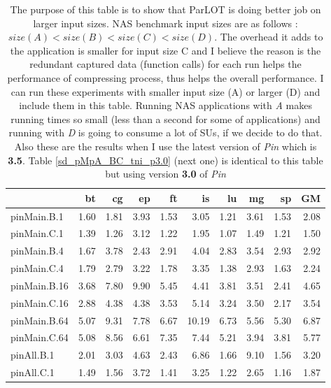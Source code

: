 \begin{table*}[]
 
 \caption{The purpose of this table is to show that ParLOT is doing better job on larger input sizes. NAS benchmark input sizes are as follows : $size(A) < size(B) < size (C) < size(D) $. The overhead it adds to the application is smaller for input size C and I believe the reason is the redundant captured data (function calls) for each run helps the performance of compressing process, thus helps the overall performance. I can run these experiments with smaller input size (A) or larger (D) and include them in this table. Running NAS applications with \textit{A} makes running times so small (less than a second for some of applications) and running with \textit{D} is going to consume a lot of SUs, if we decide to do that. Also these are the results when I use the latest version of \textit{Pin} which is \textbf{3.5}. Table \ref{sd_pMpA_BC_tni_p3.0} (next one) is identical to this table but using version \textbf{3.0} of \textit{Pin}}
 \label{sd_pMpA_BC_tni_p3.5}
\begin{center}
\begin{tabular}{|l|rrrrrrrr|r|}
\hline
              &   bt &    cg &   ep &    ft &    is &   lu &   mg &   sp &   GM \\
\hline
 pinMain.B.1  & 1.60 &  1.81 & 3.93 &  1.53 &  3.05 & 1.21 & 3.61 & 1.53 & 2.08 \\
 pinMain.C.1  & 1.39 &  1.26 & 3.12 &  1.22 &  1.95 & 1.07 & 1.49 & 1.21 & 1.50 \\
\hline
 pinMain.B.4  & 1.67 &  3.78 & 2.43 &  2.91 &  4.04 & 2.83 & 3.54 & 2.93 & 2.92 \\
 pinMain.C.4  & 1.79 &  2.79 & 3.22 &  1.78 &  3.35 & 1.38 & 2.93 & 1.63 & 2.24 \\
\hline
 pinMain.B.16 & 3.68 &  7.80 & 9.90 &  5.45 &  4.41 & 3.81 & 3.51 & 2.41 & 4.65 \\
 pinMain.C.16 & 2.88 &  4.38 & 4.38 &  3.53 &  5.14 & 3.24 & 3.50 & 2.17 & 3.54 \\
\hline
 pinMain.B.64 & 5.07 &  9.31 & 7.78 &  6.67 & 10.19 & 6.73 & 5.56 & 5.30 & 6.87 \\
 pinMain.C.64 & 5.08 &  8.56 & 6.61 &  7.35 &  7.44 & 5.21 & 3.94 & 3.81 & 5.77 \\
\hline
 pinAll.B.1   & 2.01 &  3.03 & 4.63 &  2.43 &  6.86 & 1.66 & 9.10 & 1.56 & 3.20 \\
 pinAll.C.1   & 1.49 &  1.56 & 3.72 &  1.41 &  3.25 & 1.22 & 2.65 & 1.16 & 1.87 \\

\end{tabular}
\end{center}
\end{table*}
